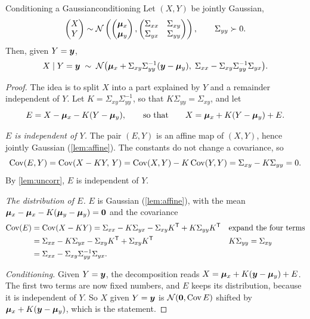 \begin{theorem}{Conditioning a Gaussian}{conditioning}
Let $(X,Y)$ be jointly Gaussian,
\[
  \begin{pmatrix}X\\Y\end{pmatrix}\sim\mathcal{N}\left(
  \begin{pmatrix}\bm{\mu}_x\\\bm{\mu}_y\end{pmatrix},
  \begin{pmatrix}\Sigma_{xx}&\Sigma_{xy}\\\Sigma_{yx}&\Sigma_{yy}
  \end{pmatrix}\right),\qquad\Sigma_{yy}\succ0.
\]
Then, given $Y=\bm{y}$,
\[
  X\mid Y=\bm{y}\;\sim\;\mathcal{N}\bigl(\bm{\mu}_x+\Sigma_{xy}\Sigma_{yy}^{-1}
  (\bm{y}-\bm{\mu}_y),\;\Sigma_{xx}-\Sigma_{xy}\Sigma_{yy}^{-1}\Sigma_{yx}\bigr).
\]
\end{theorem}

\begin{proof}
The idea is to split $X$ into a part explained by $Y$ and a remainder
independent of $Y$. Let $K=\Sigma_{xy}\Sigma_{yy}^{-1}$, so that
$K\Sigma_{yy}=\Sigma_{xy}$, and let
\[
  E=X-\bm{\mu}_x-K(Y-\bm{\mu}_y),\qquad\text{so that}\qquad
  X=\bm{\mu}_x+K(Y-\bm{\mu}_y)+E .
\]

\emph{$E$ is independent of $Y$.} The pair $(E,Y)$ is an affine map of
$(X,Y)$, hence jointly Gaussian (\cref{lem:affine}). The constants do not
change a covariance, so
\[
  \operatorname{Cov}(E,Y)=\operatorname{Cov}(X-KY,\,Y)=\operatorname{Cov}(X,Y)-K\operatorname{Cov}(Y,Y)=\Sigma_{xy}-K\Sigma_{yy}
  =0 .
\]
By \cref{lem:uncorr}, $E$ is independent of $Y$.

\emph{The distribution of $E$.} $E$ is Gaussian (\cref{lem:affine}), with
the mean $\bm{\mu}_x-\bm{\mu}_x-K(\bm{\mu}_y-\bm{\mu}_y)=\bm{0}$ and the covariance
\begin{align*}
  \operatorname{Cov}(E)&=\operatorname{Cov}(X-KY)
  =\Sigma_{xx}-K\Sigma_{yx}-\Sigma_{xy}K^{\mathsf{T}}+K\Sigma_{yy}K^{\mathsf{T}}
  &&\text{expand the four terms}\\
  &=\Sigma_{xx}-K\Sigma_{yx}-\Sigma_{xy}K^{\mathsf{T}}+\Sigma_{xy}K^{\mathsf{T}}
  &&K\Sigma_{yy}=\Sigma_{xy}\\
  &=\Sigma_{xx}-\Sigma_{xy}\Sigma_{yy}^{-1}\Sigma_{yx} .
\end{align*}

\emph{Conditioning.} Given $Y=\bm{y}$, the decomposition reads
$X=\bm{\mu}_x+K(\bm{y}-\bm{\mu}_y)+E$. The first two terms are now fixed numbers, and
$E$ keeps its distribution, because it is independent of $Y$. So $X$ given
$Y=\bm{y}$ is $\mathcal{N}(\bm{0},\operatorname{Cov} E)$ shifted by $\bm{\mu}_x+K(\bm{y}-\bm{\mu}_y)$,
which is the statement.
\end{proof}

